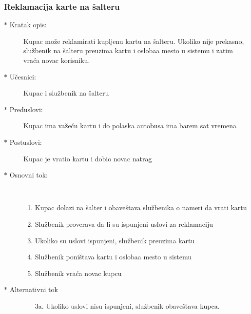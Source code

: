 \subsubsection{Reklamacija karte na \v salteru}
\begin{description}
  \item[$\ast$ Kratak opis: ] Kupac mo\v ze reklamirati kupljenu kartu na \v salteru. Ukoliko nije prekasno, slu\v zbenik na \v salteru preuzima kartu i osloba\dj{}a mesto u sistemu i zatim vra\'ca novac korisniku.
  \item[$\ast$ U\v cesnici: ] Kupac i slu\v zbenik na \v salteru
  \item[$\ast$ Preduslovi: ] Kupac ima va\v ze\'cu kartu i do polaska autobusa ima barem sat vremena
  \item[$\ast$ Postuslovi: ] Kupac je vratio kartu i dobio novac natrag
  \item[$\ast$ Osnovni tok: ] \ \\
  \begin{enumerate}
    \item Kupac dolazi na \v salter i obave\v stava slu\v zbenika o nameri da vrati kartu
    \item Slu\v zbenik proverava da li su ispunjeni uslovi za reklamaciju
    \item Ukoliko su uslovi ispunjeni, slu\v zbenik preuzima kartu
    \item Slu\v zbenik poni\v stava kartu i osloba\dj{}a mesto u sistemu
    \item Slu\v zbenik vra\'ca novac kupcu
  \end{enumerate}
  \item[$\ast$ Alternativni tok]
  \begin{enumerate}
    \item[3a. ]  Ukoliko uslovi nisu ispunjeni, slu\v zbenik obave\v stava kupca.
  \end{enumerate}
  
\end{description}

